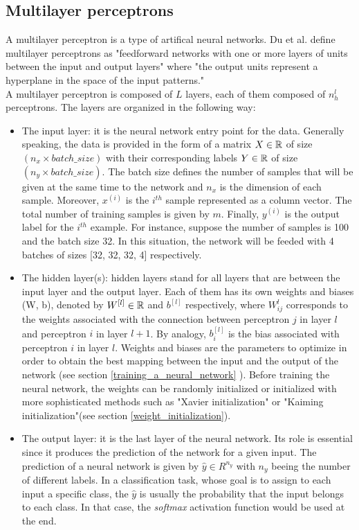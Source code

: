 \subsection{Multilayer perceptrons}
\label{multilayer_perceptron}
A multilayer perceptron is a type of artifical neural networks. Du et al. \cite{23} define multilayer perceptrons as "feedforward networks with one or more layers of units between the
input and output layers" where "the output units represent a hyperplane in the space
of the input patterns."\\
A multilayer perceptron is composed of $L$ layers, each of them composed of $n^{l}_{h}$ perceptrons. The layers are organized in the following way:
\begin{itemize}
\item The input layer: it is the neural network entry point for the data. Generally speaking, the data is provided in the form of a matrix $X \in \mathbb{R}$ of size $(n_{x} \times batch\_size)$ with their corresponding labels $Y \in \mathbb{R}$ of size $(n_{y} \times batch\_size)$. The batch size defines the number of samples that will be given at the same time to the network and $n_{x}$ is the dimension of each sample. Moreover, $x^{(i)}$ is the $i^{th}$ sample represented as a column vector. The total number of training samples is given by $m$. Finally, $y^{(i)}$ is the output label for the $i^{th}$ example. For instance, suppose the number of samples is 100 and the batch size 32. In this situation, the network will be feeded with 4 batches of sizes [32, 32, 32, 4] respectively. 

\item The hidden layer(s): hidden layers stand for all layers that are between the input layer and the output layer. Each of them has its own weights and biases (W, b), denoted by $W^{[l]} \in \mathbb{R} $ and $b^{[l]}$ respectively, where $W_{ij}^{l}$ corresponds to the weights associated with the connection between perceptron $j$ in layer $l$ and perceptron $i$ in layer $l+1$. By analogy, $b_{i}^{[l]}$ is the bias associated with perceptron $i$ in layer $l$. Weights and biases are the parameters to optimize in order to obtain the best mapping between the input and the output of the network (see section \ref{training_a_neural_network} ). Before training the neural network, the weights can be randomly initialized or initialized with more sophisticated methods such as "Xavier initialization" or "Kaiming initialization"(see section \ref{weight_initialization}).

\item The output layer: it is the last layer of the neural network. Its role is essential since it produces the prediction of the network for a given input. The prediction of a neural network is given by $\hat{y} \in R^{n_{y}}$ with $n_{y}$ beeing the number of different labels. In a classification task, whose goal is to assign to each input a specific class, the $\hat{y}$ is usually the probability that the input belongs to each class. In that case, the \textit{softmax} activation function would be used at the end.
\end{itemize}
